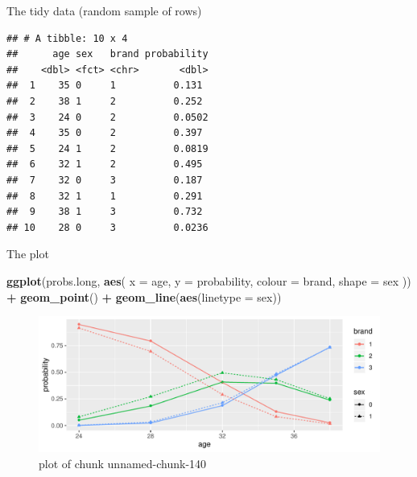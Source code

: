 \documentclass[ignorenonframetext,]{beamer}
\newenvironment{Shaded}{\begin{snugshade}}{\end{snugshade}}
\newcommand{\DataTypeTok}[1]{\textcolor[rgb]{0.13,0.29,0.53}{#1}}
\newcommand{\DecValTok}[1]{\textcolor[rgb]{0.00,0.00,0.81}{#1}}
\newcommand{\KeywordTok}[1]{\textcolor[rgb]{0.13,0.29,0.53}{\textbf{#1}}}
\newcommand{\NormalTok}[1]{#1}
\newcommand{\OperatorTok}[1]{\textcolor[rgb]{0.81,0.36,0.00}{\textbf{#1}}}
\newcommand{\StringTok}[1]{\textcolor[rgb]{0.31,0.60,0.02}{#1}}
\begin{document}
\begin{frame}[fragile]{The tidy data (random sample of rows)}
\protect\hypertarget{the-tidy-data-random-sample-of-rows}{}

\small

\begin{Shaded}
\end{Shaded}

\begin{verbatim}
## # A tibble: 10 x 4
##      age sex   brand probability
##    <dbl> <fct> <chr>       <dbl>
##  1    35 0     1          0.131 
##  2    38 1     2          0.252 
##  3    24 0     2          0.0502
##  4    35 0     2          0.397 
##  5    24 1     2          0.0819
##  6    32 1     2          0.495 
##  7    32 0     3          0.187 
##  8    32 1     1          0.291 
##  9    38 1     3          0.732 
## 10    28 0     3          0.0236
\end{verbatim}

\normalsize

\end{frame}

\begin{frame}[fragile]{The plot}
\protect\hypertarget{the-plot-1}{}

\begin{Shaded}
\begin{Highlighting}[]
\KeywordTok{ggplot}\NormalTok{(probs.long, }\KeywordTok{aes}\NormalTok{(}
  \DataTypeTok{x =}\NormalTok{ age, }\DataTypeTok{y =}\NormalTok{ probability,}
  \DataTypeTok{colour =}\NormalTok{ brand, }\DataTypeTok{shape =}\NormalTok{ sex}
\NormalTok{)) }\OperatorTok{+}
\StringTok{  }\KeywordTok{geom_point}\NormalTok{() }\OperatorTok{+}\StringTok{ }\KeywordTok{geom_line}\NormalTok{(}\KeywordTok{aes}\NormalTok{(}\DataTypeTok{linetype =}\NormalTok{ sex))}
\end{Highlighting}
\end{Shaded}

\begin{figure}
\centering
\includegraphics{figure/unnamed-chunk-140-1.pdf}
\caption{plot of chunk unnamed-chunk-140}
\end{figure}

\end{frame}
\end{document}
